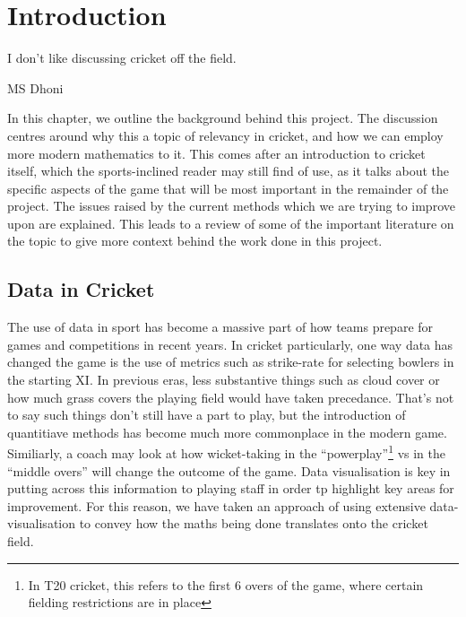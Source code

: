 \chapter{Introduction}

\epigraph{I don't like discussing cricket off the field.}{MS Dhoni}

In this chapter, we outline the background behind this project. The discussion centres around why this a topic of relevancy in cricket, and how we can employ more modern mathematics to it. This comes after an introduction to cricket itself,
which the sports-inclined reader may still find of use, as it talks about the specific aspects of the game that will be most important in the remainder of the project. The issues raised by the current methods 
which we are trying to improve upon are explained. This leads to a review of some of the important literature on the topic to give more context behind the work done in this project.

\section{Data in Cricket}
The use of data in sport has become a massive part of how teams prepare for games and competitions in recent years. In cricket particularly, one way data has changed the game is the use
of metrics such as strike-rate for selecting bowlers in the starting XI. In previous eras, less substantive things such as cloud cover or how much grass covers the playing field would have taken precedance.
That's not to say such things don't still have a part to play, but the introduction of quantitiave methods has become much more commonplace in the modern game.
Similiarly, a coach may look at how wicket-taking in the ``powerplay''\footnote{In T20 cricket, this refers to the first 6 overs of the game, where certain fielding restrictions are in place}
vs in the ``middle overs'' will change the outcome of the game. Data visualisation is key in putting across this information to playing staff in order tp highlight key areas for
improvement. For this reason, we have taken an approach of using extensive data-visualisation to convey how the maths being done translates onto the cricket field. 

